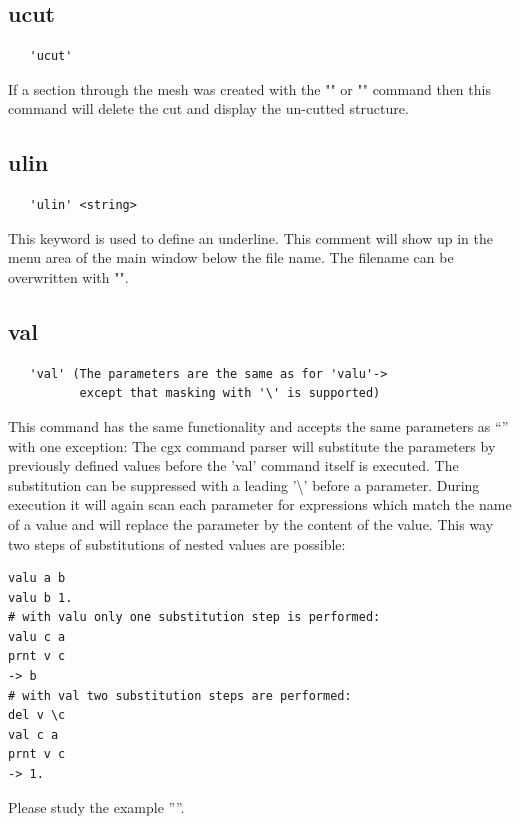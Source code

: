 \documentclass{article}
\begin{document}
\subsection{\label{ucut}ucut}
\begin{verbatim}
   'ucut'
\end{verbatim}
If a section through the mesh was created with the "" or "" command then this command will delete the cut and display the un-cutted structure.

\subsection{\label{ulin}ulin}
\begin{verbatim}
   'ulin' <string> 
\end{verbatim}
This keyword is used to define an underline. This comment will show up in the
menu area of the main window below the file name. The filename can be overwritten with "".

\subsection{\label{val}val}
\begin{verbatim}
   'val' (The parameters are the same as for 'valu'->
          except that masking with '\' is supported)
\end{verbatim}
This command has the same functionality and accepts the same parameters as ``'' with one exception: The cgx command parser will substitute the parameters by previously defined values before the 'val' command itself is executed. The substitution can be suppressed with a leading '\textbackslash{}' before a parameter. During execution it will again scan each parameter for expressions which match the name of a value and will replace the parameter by the content of the value. This way two steps of substitutions of nested values are possible:
\begin{verbatim}
valu a b
valu b 1.
# with valu only one substitution step is performed:
valu c a
prnt v c
-> b
# with val two substitution steps are performed:
del v \c
val c a
prnt v c
-> 1.
\end{verbatim}
Please study the example ''''.
\end{document}
